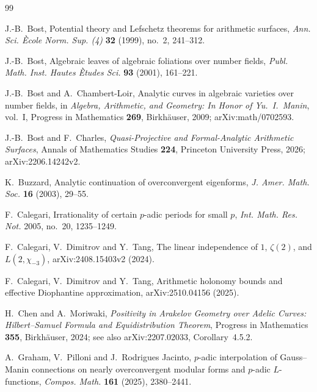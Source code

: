 \documentclass[11pt]{article}
\theoremstyle{definition}
\theoremstyle{remark}
\begin{document}
\begin{thebibliography}{99}

J.-B.~Bost,
\newblock Potential theory and Lefschetz theorems for arithmetic surfaces,
\newblock \emph{Ann. Sci. \`Ecole Norm. Sup. (4)} \textbf{32} (1999), no.~2,
241--312.

J.-B.~Bost,
\newblock Algebraic leaves of algebraic foliations over number fields,
\newblock \emph{Publ. Math. Inst. Hautes \`Etudes Sci.} \textbf{93} (2001),
161--221.


J.-B.~Bost and A.~Chambert-Loir,
\newblock Analytic curves in algebraic varieties over number fields,
\newblock in \emph{Algebra, Arithmetic, and Geometry: In Honor of
Yu.~I.~Manin}, vol.~I, Progress in Mathematics \textbf{269}, Birkh\"auser,
2009; arXiv:math/0702593.

J.-B.~Bost and F.~Charles,
\newblock \emph{Quasi-Projective and Formal-Analytic Arithmetic Surfaces},
\newblock Annals of Mathematics Studies \textbf{224}, Princeton University
Press, 2026; arXiv:2206.14242v2.

K.~Buzzard,
\newblock Analytic continuation of overconvergent eigenforms,
\newblock \emph{J. Amer. Math. Soc.} \textbf{16} (2003), 29--55.

F.~Calegari,
\newblock Irrationality of certain $p$-adic periods for small $p$,
\newblock \emph{Int. Math. Res. Not.} 2005, no.~20, 1235--1249.

F.~Calegari, V.~Dimitrov and Y.~Tang,
\newblock The linear independence of $1$, $\zeta(2)$, and $L(2,\chi_{-3})$,
\newblock arXiv:2408.15403v2 (2024).

F.~Calegari, V.~Dimitrov and Y.~Tang,
\newblock Arithmetic holonomy bounds and effective Diophantine approximation,
\newblock arXiv:2510.04156 (2025).

H.~Chen and A.~Moriwaki,
\newblock \emph{Positivity in Arakelov Geometry over Adelic Curves:
Hilbert--Samuel Formula and Equidistribution Theorem},
\newblock Progress in Mathematics \textbf{355}, Birkh\"auser, 2024;
see also arXiv:2207.02033, Corollary~4.5.2.

A.~Graham, V.~Pilloni and J.~Rodrigues Jacinto,
\newblock $p$-adic interpolation of Gauss--Manin connections on nearly
overconvergent modular forms and $p$-adic $L$-functions,
\newblock \emph{Compos. Math.} \textbf{161} (2025), 2380--2441.


\end{thebibliography}
\end{document}
